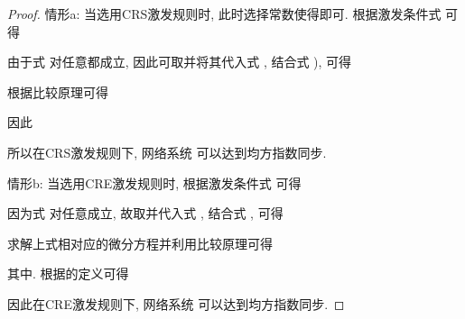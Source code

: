 \begin{proof}
            情形a: 当选用CRS激发规则时, 此时选择常数使得即可. 根据激发条件式 可得
            \begin{comment}\label{equ:18}
                \mathrm{E}\tilde{e}^{\top}(t)\tilde{e}(t)\leq\omega^2\mathrm{E}e^\top(t)e(t).
            \end{comment}
            由于式  对任意都成立, 因此可取并将其代入式 , 结合式 ), 可得
            \begin{comment}
                \mathrm{E}\mathcal{L}V(t)\leq -\delta \mathrm{E}V(t).
            \end{comment}
            根据比较原理可得
            \begin{comment}
            \mathrm{E}V(t)\leq \mathrm{E}V(0)e^{-\delta t}.
            \end{comment}
            因此
            \begin{comment}
             \mathrm{E}\| x_{i}(t)-s(t)\|^2&\leq\frac{2}{\underline{\varepsilon}}\mathrm{E}V(0)e^{-\delta t},\quad i=1,2,\cdots,N.
            \end{comment}
            所以在CRS激发规则下, 网络系统  可以达到均方指数同步.

        情形b: 当选用CRE激发规则时, 根据激发条件式  可得
            \begin{comment}\label{equwan}
                \mathrm{E}\tilde{e}^{\top}(t)\tilde{e}(t)\leq Na^2e^{-2bt}.
            \end{comment}
        因为式  对任意成立, 故取并代入式 , 结合式 , 可得
            \begin{comment}
            \mathrm{E}\mathcal{L}V(t)
            \leq \frac{Nca^2\bar{\varepsilon}}{2\omega}e^{-2bt} -\delta \mathrm{E}V(t).
            \end{comment}
        求解上式相对应的微分方程并利用比较原理可得
            \begin{comment}
            \mathrm{E}V(t,e(t))&\leq\frac{Nca^2\bar{\varepsilon}}{2\omega(-2b+\delta)}\Big[e^{(-2b+\delta)t}-1\Big]e^{-\delta t}+ \mathrm{E}V(0,e(0))e^{-\delta t}
            =\pi e^{-\delta t},
            \end{comment}
        其中. 根据的定义可得
             \begin{comment}
             \mathrm{E}\| x_{i}(t)-s(t)\|^2\leq\frac{2\pi}{\underline{\varepsilon}}e^{-\delta t},\quad i=1,2,\cdots,N.
            \end{comment}
           因此在CRE激发规则下, 网络系统  可以达到均方指数同步.
        \end{proof}
